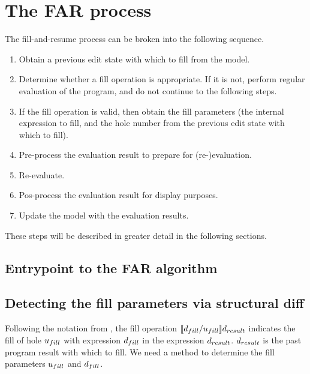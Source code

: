 \section{The FAR process}
\label{sec:far-process}

The fill-and-resume process can be broken into the following sequence.

\begin{enumerate}
\item Obtain a previous edit state with which to fill from the model.
\item Determine whether a fill operation is appropriate. If it is not, perform regular evaluation of the program, and do not continue to the following steps.
\item If the fill operation is valid, then obtain the fill parameters (the internal expression to fill, and the hole number from the previous edit state with which to fill).
\item Pre-process the evaluation result to prepare for (re-)evaluation.
\item Re-evaluate.
\item Pos-process the evaluation result for display purposes.
\item Update the model with the evaluation results.
\end{enumerate}

These steps will be described in greater detail in the following sections.

\subsection{Entrypoint to the FAR algorithm}
\label{sec:far-entrypoint}



\subsection{Detecting the fill parameters via structural diff}
\label{sec:obtaining-fill-parameters}

Following the notation from \cite{conf/popl/HazelnutLive19}, the fill operation $\llbracket{}d_{fill}/u_{fill}\rrbracket{}d_{result}$ indicates the fill of hole $u_{fill}$ with expression $d_{fill}$ in the expression $d_{result}$. $d_{result}$ is the past program result with which to fill. We need a method to determine the fill parameters $u_{fill}$ and $d_{fill}$.

